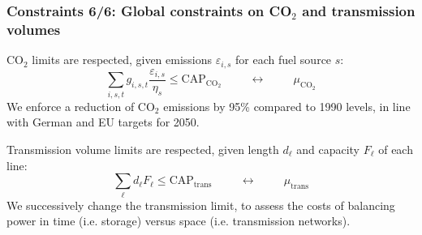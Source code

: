 \documentclass[10pt,aspectratio=169,dvipsnames]{beamer}
\def\m{\mu}
\def\co2{CO${}_2$}
\begin{document}
\begin{frame}
  \frametitle{Constraints 6/6: Global constraints on \co2 and transmission volumes}
  CO${}_2$ limits are respected, given emissions $\varepsilon_{i,s}$ for each fuel source $s$:
    \begin{equation*}
      \sum_{i,s,t}  g_{i,s,t} \frac{\varepsilon_{i,s}}{\eta_{s}} \leq \textrm{CAP}_{\textrm{CO}_2} \hspace{1cm} \leftrightarrow \hspace{1cm} \m_{\textrm{CO}_2}
    \end{equation*}
    We enforce a reduction of \co2 emissions by 95\% compared to 1990
    levels, in line with German and EU targets for 2050.

    Transmission volume limits are respected, given length $d_\ell$ and capacity $F_\ell$ of each line:
    \begin{equation*}
      \sum_{\ell} d_\ell   F_\ell \leq \textrm{CAP}_{\textrm{trans}} \hspace{1cm} \leftrightarrow \hspace{1cm} \m_{\textrm{trans}}
    \end{equation*}
    We  successively change the transmission limit, to assess the costs of balancing power in time (i.e. storage) versus space (i.e. transmission networks).

\end{frame}
\end{document}
